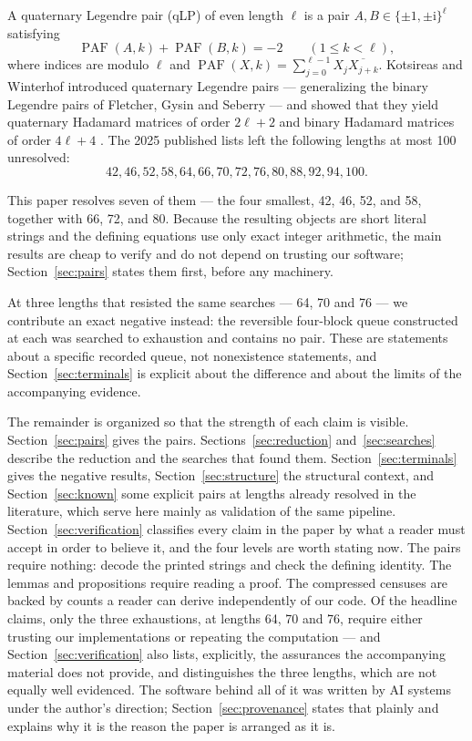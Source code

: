 \documentclass[11pt]{article}
\newcommand{\PAF}{\operatorname{PAF}}
\newcommand{\ii}{\mathrm{i}}
\newcommand{\roots}{\{\pm 1,\pm\ii\}}
\begin{document}
A quaternary Legendre pair (qLP) of even length $\ell$ is a pair
$A,B\in\roots^\ell$ satisfying
\begin{equation}
  \PAF(A,k)+\PAF(B,k)=-2
  \qquad (1\leq k<\ell),
  \label{eq:qlp}
\end{equation}
where indices are modulo $\ell$ and
$\PAF(X,k)=\sum_{j=0}^{\ell-1}X_j\overline{X_{j+k}}$.
Kotsireas and Winterhof introduced quaternary Legendre pairs --- generalizing
the binary Legendre pairs of Fletcher, Gysin and Seberry
\cite{fletcher-gysin-seberry-2001} --- and showed that
they yield quaternary Hadamard matrices of order $2\ell+2$ and binary
Hadamard matrices of order $4\ell+4$ \cite{kotsireas-winterhof-2024}.
The 2025 published lists
\cite{kotsireas-koutschan-winterhof-2025,jedwab-pender-2025} left the
following lengths at most 100 unresolved:
\[
  42,46,52,58,64,66,70,72,76,80,88,92,94,100.
\]

This paper resolves seven of them --- the four smallest, 42, 46, 52, and 58,
together with 66, 72, and 80.  Because
the resulting objects are short literal strings and the defining equations use
only exact integer arithmetic, the main results are cheap to verify and do not
depend on trusting our software; Section~\ref{sec:pairs} states them first,
before any machinery.

At three lengths that resisted the same searches --- 64, 70 and 76 --- we
contribute an exact negative instead: the reversible four-block queue
constructed at each was searched to exhaustion and contains no pair.  These
are statements about a specific recorded queue, not nonexistence statements,
and
Section~\ref{sec:terminals} is explicit about the difference and about the
limits of the accompanying evidence.

The remainder is organized so that the strength of each claim is visible.
Section~\ref{sec:pairs} gives the pairs.  Sections~\ref{sec:reduction}
and~\ref{sec:searches} describe the reduction and the searches that found
them.  Section~\ref{sec:terminals} gives the negative results,
Section~\ref{sec:structure} the structural context, and
Section~\ref{sec:known} some explicit pairs at lengths already resolved in
the literature, which serve here mainly as validation of the same pipeline.
Section~\ref{sec:verification} classifies every claim in the paper by what a
reader must accept in order to believe it, and the four levels are worth
stating now.  The pairs require nothing: decode the printed strings and check
the defining identity.  The lemmas and propositions require reading a proof.
The compressed censuses are backed by counts a reader can derive independently
of our code.  Of the headline claims, only the three exhaustions, at lengths
64, 70 and 76,
require either trusting our implementations or repeating the computation --- and
Section~\ref{sec:verification} also lists, explicitly, the assurances the
accompanying material does not provide, and distinguishes the three lengths,
which are not equally well evidenced.  The software behind all of it was written
by AI systems under the author's direction; Section~\ref{sec:provenance} states
that plainly and explains why it is the reason the paper is arranged as it is.
\end{document}
